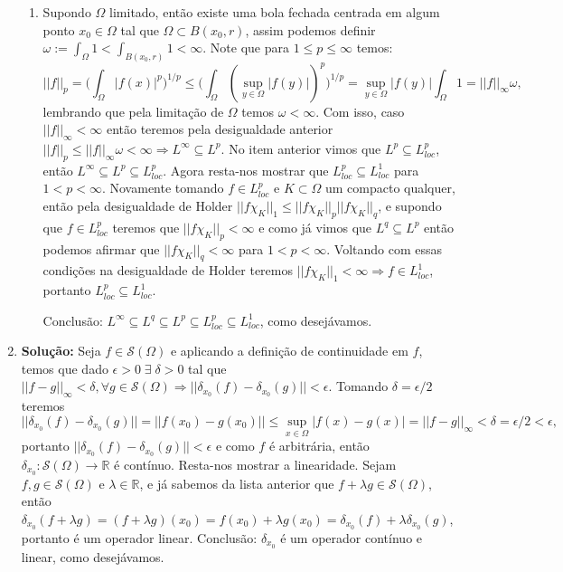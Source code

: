 \documentclass{article}
\begin{document}
\begin{enumerate}
\begin{enumerate}
			\item Supondo $\Omega$ limitado, então existe uma bola fechada centrada em algum ponto $x_{0} \in \Omega$ tal que $\Omega \subset B(x_{0}, r)$, assim podemos definir $\omega := \int_{\Omega} 1 < \int_{B(x_0, r)} 1 < \infty$. Note que para $1 \leq p \leq \infty$ temos:
			$$
			||f||_{p} = \Big( \int_{\Omega} |f(x)|^{p} \Big)^{1/p} \leq \Big( \int_{\Omega} (\sup_{y \in \Omega}|f(y)|)^{p} \Big)^{1/p} = \sup_{y \in \Omega}|f(y)|\int_{\Omega} 1 = ||f||_{\infty}\omega,
			$$
			lembrando que pela limitação de $\Omega$ temos $\omega < \infty$. Com isso, caso $||f||_{\infty} < \infty$ então teremos pela desigualdade anterior $||f||_{p} \leq ||f||_{\infty}\omega < \infty \Rightarrow L^{\infty} \subseteq L^{p}$. No item anterior vimos que $L^{p} \subseteq L^{p}_{loc}$, então $L^{\infty } \subseteq L^{p} \subseteq L^{p}_{loc}$. Agora resta-nos mostrar que $L^{p}_{loc} \subseteq L^{1}_{loc}$ para $1 < p < \infty$. Novamente tomando $f \in L^{p}_{loc}$ e $K \subset \Omega$ um compacto qualquer, então pela desigualdade de Holder $||f\chi_{K}||_{1} \leq ||f\chi_{K}||_{p}||f\chi_{K}||_{q}$, e supondo que $f \in L^{p}_{loc}$ teremos que $||f\chi_{K}||_{p} < \infty$ e como já vimos que $L^{q} \subseteq L^{p}$ então podemos afirmar que $||f\chi_{K}||_{q} < \infty$ para $1 < p < \infty$. Voltando com essas condições na desigualdade de Holder teremos $||f\chi_{K}||_{1} < \infty \Rightarrow f \in L^{1}_{loc}$, portanto $L^{p}_{loc} \subseteq L^{1}_{loc}$. 
			
			Conclusão: $L^{\infty} \subseteq L^{q} \subseteq L^{p} \subseteq L^{p}_{loc} \subseteq L^{1}_{loc}$, como desejávamos.
		\end{enumerate}
		
		\item \textbf{Solução:} Seja $f \in \mathcal{S}(\Omega)$ e aplicando a definição de continuidade em $f$, temos que dado $\epsilon >0 \; \exists \; \delta >0$ tal que $||f - g||_{\infty} < \delta, \forall g \in \mathcal{S}(\Omega) \Rightarrow ||\delta_{x_0}(f) - \delta_{x_0}(g)|| < \epsilon$. Tomando $\delta = \epsilon/2$ teremos $$
		||\delta_{x_0}(f) - \delta_{x_0}(g)|| = ||f(x_{0}) - g(x_{0})|| \leq \sup_{x \in \Omega}|f(x) -g(x)| = ||f-g||_{\infty} < \delta = \epsilon/2 < \epsilon,
		$$ 
		portanto $||\delta_{x_0}(f) - \delta_{x_0}(g)||<\epsilon$ e como $f$ é arbitrária, então $\delta_{x_{0}} : \mathcal{S}(\Omega) \to \mathbb{R}$ é contínuo. Resta-nos mostrar a linearidade. Sejam $f, g \in \mathcal{S}(\Omega)$ e $\lambda \in \mathbb{R}$, e já sabemos da lista anterior que $f+\lambda g \in \mathcal{S}(\Omega)$, então $\delta_{x_{0}}(f+\lambda g) = (f+\lambda g)(x_{0}) = f(x_{0})+\lambda g(x_{0}) = \delta_{x_{0}}(f) + \lambda \delta_{x_{0}}(g)$, portanto é um operador linear. Conclusão: $\delta_{x_{0}}$ é um operador contínuo e linear, como desejávamos.
	\end{enumerate}
	
\end{document}
